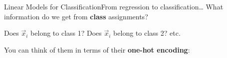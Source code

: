 \begin{frame}{Linear Models for Classification}{From regression to classification\dots}
    What information do we get from \textbf{class} assignments?

    \vfill \pause

    \begin{center}
        Does $\vec{x}_i$ belong to class 1? Does $\vec{x}_i$ belong to class 2? etc.
    \end{center}

    \vfill \pause

    You can think of them in terms of their \textbf{one-hot encoding}:
    \begin{center}
    \end{center}
\end{frame}

